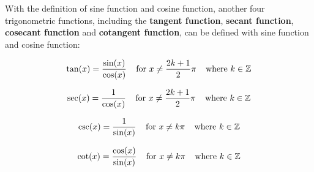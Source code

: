 \documentclass[a4paper,12pt]{article}
\begin{document}
\begin{dft}
  With the definition of sine function and cosine function, another four trigonometric functions, including the \textbf{tangent function}, \textbf{secant function}, \textbf{cosecant function} and \textbf{cotangent function}, can be defined with sine function and cosine function:

  $$\tan(x)=\frac{\sin(x)}{\cos(x)}\;\;\;\;\text{for }x\neq\frac{2k+1}{2}\pi\;\;\;\;\text{where }k\in\mathbb{Z}$$\s

  $$\sec(x)=\frac{1}{\cos(x)}\;\;\;\;\text{for }x\neq\frac{2k+1}{2}\pi\;\;\;\;\text{where }k\in\mathbb{Z}$$\s

  $$\csc(x)=\frac{1}{\sin(x)}\;\;\;\;\text{for }x\neq k\pi\;\;\;\;\text{where }k\in\mathbb{Z}$$\s

  $$\cot(x)=\frac{\cos(x)}{\sin(x)}\;\;\;\;\text{for }x\neq k\pi\;\;\;\;\text{where }k\in\mathbb{Z}$$
\end{dft}

\propdisp
\end{document}
